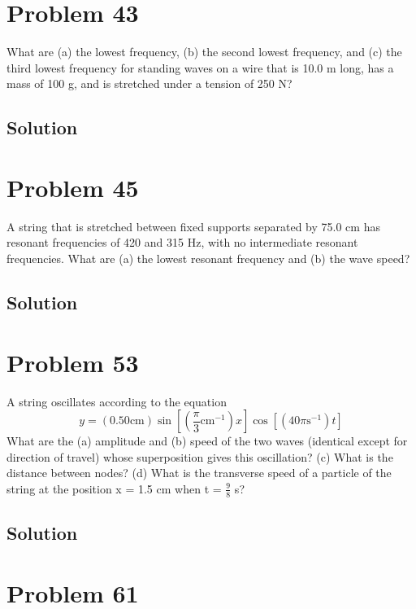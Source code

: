 \documentclass[12pt]{article}
\begin{document}
    \section{Problem 43}
        What are (a) the lowest frequency, (b) the second lowest frequency, and (c) the third lowest frequency for standing waves on a wire that is 10.0 m long, has a mass of 100 g, and is stretched under a tension of 250 N?

        \subsection{Solution}

    \section{Problem 45}
        A string that is stretched between fixed supports separated by 75.0 cm has resonant frequencies of 420 and 315 Hz, with no intermediate resonant frequencies. 
        What are (a) the lowest resonant frequency and (b) the wave speed?

        \subsection{Solution}

    \section{Problem 53}
        A string oscillates according to the equation
        \begin{equation}
            y = (0.50 \unit{\centi\meter}) \sin \left[  ( \frac{\pi}{3} \unit{\centi\meter^{-1}})x \right] \cos\left[ (40\pi \unit{\second^{-1}} )t \right]
        \end{equation}
        What are the (a) amplitude and (b) speed of the two waves (identical except for direction of travel) whose superposition gives this oscillation? 
        (c) What is the distance between nodes? 
        (d) What is the transverse speed of a particle of the string at the position x = 1.5 cm when t = $\frac{9}{8}$ s?

        \subsection{Solution}

    \pagebreak
    \section{Problem 61}
\end{document}
